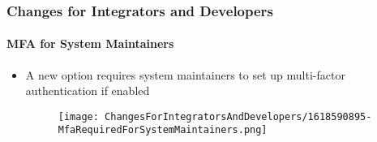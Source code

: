 %

\begin{frame}[fragile]
	\frametitle{Changes for Integrators and Developers}
	\framesubtitle{MFA for System Maintainers}


	\begin{itemize}
		\item A new option requires system maintainers to set up multi-factor
			authentication if enabled
		\vspace{0.4cm}
		\begin{figure}
			\texttt{[image: ChangesForIntegratorsAndDevelopers/1618590895-MfaRequiredForSystemMaintainers.png]}
		\end{figure}
	\end{itemize}
\end{frame}

